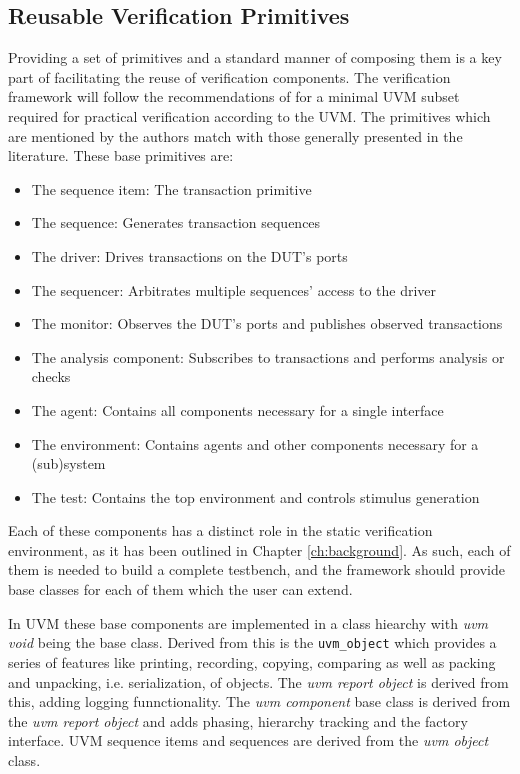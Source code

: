 \documentclass[11pt,a4paper]{report}
\newcommand{\ttt}{\texttt}
\begin{document}
\subsection{Reusable Verification Primitives} %

Providing a set of primitives and a standard manner of composing them is a key part of facilitating the reuse of
verification components. The verification framework will follow the recommendations of \citeauthor{sutherland2015uvm}
\cite{sutherland2015uvm} for a minimal UVM subset required for practical verification according to the UVM. The
primitives which are mentioned by the authors match with those generally presented in the literature. These base primitives are:

\begin{itemize}
  \item The sequence item: The transaction primitive
  \item The sequence: Generates transaction sequences
  \item The driver: Drives transactions on the DUT's ports
  \item The sequencer: Arbitrates multiple sequences' access to the driver
  \item The monitor: Observes the DUT's ports and publishes observed transactions
  \item The analysis component: Subscribes to transactions and performs analysis or checks
  \item The agent: Contains all components necessary for a single interface
  \item The environment: Contains agents and other components necessary for a (sub)system
  \item The test: Contains the top environment and controls stimulus generation
\end{itemize}

Each of these components has a distinct role in the static verification environment, as it has been outlined in
Chapter \ref{ch:background}. As such, each of them is needed to build a complete testbench, and the framework should
provide base classes for each of them which the user can extend.

In UVM these base components are implemented in a class hiearchy with \textit{uvm void} being the base class. Derived
from this is the \ttt{uvm\_object} which provides a series of features like printing, recording, copying, comparing
as well as packing and unpacking, i.e. serialization, of objects. The \textit{uvm report object} is derived from
this, adding logging funnctionality. The \textit{uvm component} base class is derived from the \textit{uvm report
object} and adds phasing, hierarchy tracking and the factory interface. UVM sequence items and sequences are derived
from the \textit{uvm object} class.
\end{document}
